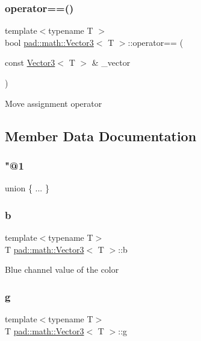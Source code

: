 \subsubsection{\texorpdfstring{operator==()}{operator==()}}
{\footnotesize\ttfamily template$<$typename T $>$ \\
bool \mbox{\hyperlink{structpad_1_1math_1_1_vector3}{pad\+::math\+::\+Vector3}}$<$ T $>$\+::operator== (\begin{DoxyParamCaption}\item[{const \mbox{\hyperlink{structpad_1_1math_1_1_vector3}{Vector3}}$<$ T $>$ \&}]{\+\_\+vector }\end{DoxyParamCaption})}

Move assignment operator 

\subsection{Member Data Documentation}
\mbox{\label{structpad_1_1math_1_1_vector3_a85cf7a3b4a5c570cfb3139ef228f65ab}} 
\subsubsection{\texorpdfstring{"@1}{@1}}
{\footnotesize\ttfamily union \{ ... \} }

\mbox{\label{structpad_1_1math_1_1_vector3_afaba266e93b4c9f0a14048934ac2f3f6}} 
\subsubsection{\texorpdfstring{b}{b}}
{\footnotesize\ttfamily template$<$typename T$>$ \\
T \mbox{\hyperlink{structpad_1_1math_1_1_vector3}{pad\+::math\+::\+Vector3}}$<$ T $>$\+::b}

Blue channel value of the color \mbox{\label{structpad_1_1math_1_1_vector3_ab0c584460b01a899fe4504c48c2037e4}} 
\subsubsection{\texorpdfstring{g}{g}}
{\footnotesize\ttfamily template$<$typename T$>$ \\
T \mbox{\hyperlink{structpad_1_1math_1_1_vector3}{pad\+::math\+::\+Vector3}}$<$ T $>$\+::g}

